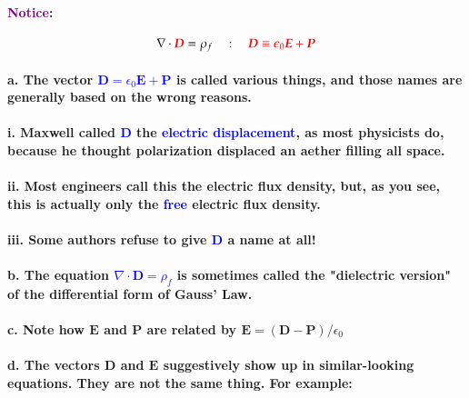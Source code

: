 \documentclass{article}
\begin{document}
\paragraph{\textcolor{purple}{Notice}:}
\begin{equation*}
    \nabla\cdot \textcolor{red}{\boldsymbol{D}}=\rho_f\quad:\quad \textcolor{red}{\boldsymbol{D}\equiv\epsilon_0\boldsymbol{E}+\boldsymbol{P}}
\end{equation*}
\paragraph{\indent a. The vector \textcolor{blue}{$\boldsymbol{D}=\epsilon_0\boldsymbol{E}+\boldsymbol{P}$} is called various things, and those names are generally based on the wrong reasons.}
\paragraph{\indent \indent i. Maxwell called \textcolor{blue}{$\boldsymbol{D}$} the \textcolor{blue}{electric displacement}, as most physicists do, because he thought polarization displaced an aether filling all space.}
\paragraph{\indent \indent ii. Most engineers call this the electric flux density, but, as you see, this is actually only the \textcolor{blue}{free} electric flux density.}
\paragraph{\indent \indent iii. Some authors refuse to give \textcolor{blue}{$\boldsymbol{D}$} a name at all!}
\paragraph{\indent b. The equation \textcolor{blue}{$\nabla\cdot \boldsymbol{D}=\rho_f$} is sometimes called the "dielectric version" of the differential form of Gauss' Law.}
\paragraph{\indent c. Note how $\boldsymbol{E}$ and $\boldsymbol{P}$ are related by $\boldsymbol{E}=(\boldsymbol{D}-\boldsymbol{P})/\epsilon_0$}
\paragraph{\indent d. The vectors $\boldsymbol{D}$ and $\boldsymbol{E}$ suggestively show up in similar-looking equations. They are not the same thing. For example:}
\end{document}

